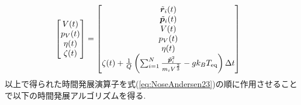 \begin{align}
\begin{bmatrix}
  V (t) \\
  p_{V} (t) \\
  \eta (t) \\
  \zeta (t) \\
 \end{bmatrix}
 &=
 \begin{bmatrix}
  \Tilde{\bm{r}}_{i} (t) \\
  \Tilde{\bm{p}}_{i} (t) \\
  V (t) \\
  p_{V} (t) \\
  \eta (t) \\
  \zeta (t) + \frac{1}{Q}
  \left(
  \sum_{i=1}^{N} \frac{\Tilde{\bm{p}}_{i}^{2}}{m_{i} V^{\frac{2}{3}}} - g k_{B} T_{\mathrm{eq}}
  \right) \Delta t \\
 \end{bmatrix}
 \label{eq:NoseAndersen24.5}
\end{align}
以上で得られた時間発展演算子を式(\ref{eq:NoseAndersen23})の順に作用させることで以下の時間発展アルゴリズムを得る. 
